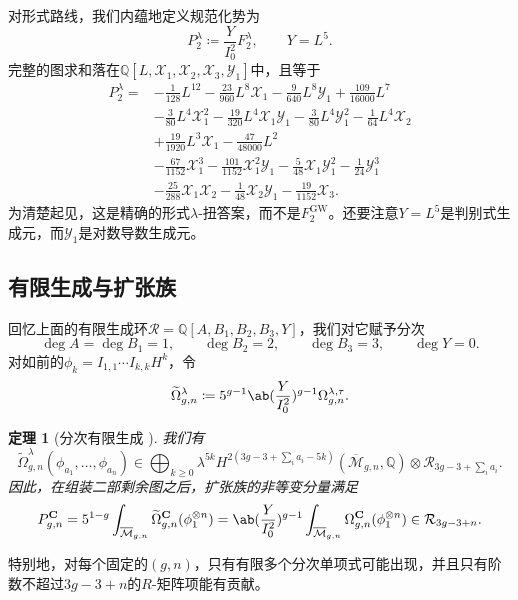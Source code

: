 \documentclass{amsart}
\newtheorem{thm}{定理}[section]
\theoremstyle{definition}
\theoremstyle{remark}
\theoremstyle{plain}
\theoremstyle{definition}
\theoremstyle{remark}
\newcommand{\Q}{\mathbb{Q}}
\newcommand{\Mbar}{\overline{\mathcal{M}}}
\newcommand{\mc}[1]{\mathcal{#1}}
\newcommand{\mbf}[1]{\mathbf{#1}}
\newcommand{\mr}[1]{\mathrm{#1}}
\newcommand{\wt}[1]{\widetilde{#1}}
\newcommand{\1}{\mathbf{1}}
\newcommand{\2}{\mathbf{2}}
\newcommand{\3}{\mathbf{3}}
\begin{document}
对形式路线，我们内蕴地定义规范化势为
\[ P_2^{\lambda} \coloneqq \frac{Y}{I_0^2}F_2^{\lambda}, \qquad Y = L^5. \]
完整的图求和落在\(\Q[L,\mc{X}_1,\mc{X}_2,\mc{X}_3,\mc{Y}_1]\)中，且等于
\begin{align*}
    P_2^{\lambda} ={}& -\frac{1}{128}L^{12} - \frac{23}{960}L^8\mc{X}_1 - \frac{9}{640}L^8\mc{Y}_1 + \frac{109}{16000}L^7 \\
    &- \frac{3}{80}L^4\mc{X}_1^2 - \frac{19}{320}L^4\mc{X}_1\mc{Y}_1 - \frac{3}{80}L^4\mc{Y}_1^2 - \frac{1}{64}L^4\mc{X}_2 \\
    &+ \frac{19}{1920}L^3\mc{X}_1 - \frac{47}{48000}L^2 \\
    &- \frac{67}{1152}\mc{X}_1^3 - \frac{101}{1152}\mc{X}_1^2\mc{Y}_1 - \frac{5}{48}\mc{X}_1\mc{Y}_1^2 - \frac{1}{24}\mc{Y}_1^3 \\
    &- \frac{25}{288}\mc{X}_1\mc{X}_2 - \frac{1}{48}\mc{X}_2\mc{Y}_1 - \frac{19}{1152}\mc{X}_3.
\end{align*}
为清楚起见，这是精确的形式\(\lambda\)-扭答案，而不是\(F_2^{\mr{GW}}\)。还要注意\(Y = L^5\)是判别式生成元，而\(\mc{Y}_1\)是对数导数生成元。

\subsection{有限生成与扩张族}%
\label{sub:Finite generation and the extended family}

回忆上面的有限生成环\(\mc{R} = \Q[A,B_1,B_2,B_3,Y]\)，我们对它赋予分次
\[ \deg A = \deg B_1 = 1, \qquad \deg B_2 = 2, \qquad \deg B_3 = 3, \qquad \deg Y = 0. \]
对如前的\(\phi_k = I_{1,1}\cdots I_{k,k}H^k\)，令
\[ \wt{\Omega}^{\lambda}_{g,n} \coloneqq 5^{g-1}\ab(\frac{Y}{I_0^2})^{g-1}\Omega^{\lambda,\tau}_{g,n}. \]

\begin{thm}[分次有限生成 {\cite{GJRstructure}}]%
\label{thm:graded finite generation}
    我们有
    \[ \wt{\Omega}^{\lambda}_{g,n}(\phi_{a_1}, \ldots, \phi_{a_n}) \in \bigoplus_{k \geq 0}\lambda^{5k}H^{2(3g-3+\sum_i a_i - 5k)}(\Mbar_{g,n},\Q)\otimes \mc{R}_{3g-3+\sum_i a_i}. \]
    因此，在组装二部剩余图之后，扩张族的非等变分量满足
    \[ P^{\mbf{C}}_{g,n} = 5^{1-g}\int_{\Mbar_{g,n}}\wt{\Omega}^{\mbf{C}}_{g,n}(\phi_1^{\otimes n}) = \ab( \frac{Y}{I_0^2})^{g-1}\int_{\Mbar_{g,n}}\Omega^{\mbf{C}}_{g,n}(\phi_1^{\otimes n}) \in \mc{R}_{3g-3+n}. \]
\end{thm}

特别地，对每个固定的\((g,n)\)，只有有限多个分次单项式可能出现，并且只有阶数不超过\(3g-3+n\)的\(R\)-矩阵项能有贡献。
\end{document}
